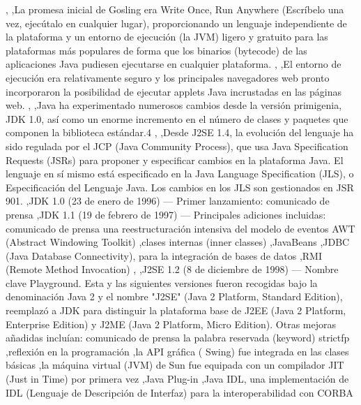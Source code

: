 \documentclass[11pt,a4paper]{$type}
\begin{document}
	\bigskip
							,
	\bigskip
							,La promesa inicial de Gosling era Write Once, Run Anywhere (Escríbelo una vez, ejecútalo en cualquier lugar), proporcionando un lenguaje independiente de la plataforma y un entorno de ejecución (la JVM) ligero y gratuito para las plataformas más populares de forma que los binarios (bytecode) de las aplicaciones Java pudiesen ejecutarse en cualquier plataforma.
	\bigskip
							,
	\bigskip
							,El entorno de ejecución era relativamente seguro y los principales navegadores web pronto incorporaron la posibilidad de ejecutar applets Java incrustadas en las páginas web.
	\bigskip
							,
	\bigskip
							,Java ha experimentado numerosos cambios desde la versión primigenia, JDK 1.0, así como un enorme incremento en el número de clases y paquetes que componen la biblioteca estándar.4
	\bigskip
							,
	\bigskip
							,Desde J2SE 1.4, la evolución del lenguaje ha sido regulada por el JCP (Java Community Process), que usa Java Specification Requests (JSRs) para proponer y especificar cambios en la plataforma Java. El lenguaje en sí mismo está especificado en la Java Language Specification (JLS), o Especificación del Lenguaje Java. Los cambios en los JLS son gestionados en JSR 901.
	\bigskip
							,JDK 1.0 (23 de enero de 1996) — Primer lanzamiento: comunicado de prensa
	\bigskip
							,JDK 1.1 (19 de febrero de 1997) — Principales adiciones incluidas: comunicado de prensa una reestructuración intensiva del modelo de eventos AWT (Abstract Windowing Toolkit)
	\bigskip
							,clases internas (inner classes)
	\bigskip
							,JavaBeans
	\bigskip
							,JDBC (Java Database Connectivity), para la integración de bases de datos
	\bigskip
							,RMI (Remote Method Invocation)
	\bigskip
							,
	\bigskip
							,J2SE 1.2 (8 de diciembre de 1998) — Nombre clave Playground. Esta y las siguientes versiones fueron recogidas bajo la denominación Java 2 y el nombre "J2SE" (Java 2 Platform, Standard Edition), reemplazó a JDK para distinguir la plataforma base de J2EE (Java 2 Platform, Enterprise Edition) y J2ME (Java 2 Platform, Micro Edition). Otras mejoras añadidas incluían: comunicado de prensa la palabra reservada (keyword) strictfp
	\bigskip
							,reflexión en la programación
	\bigskip
							,la API gráfica ( Swing) fue integrada en las clases básicas
	\bigskip
							,la máquina virtual (JVM) de Sun fue equipada con un compilador JIT (Just in Time) por primera vez
	\bigskip
							,Java Plug-in
	\bigskip
							,Java IDL, una implementación de IDL (Lenguaje de Descripción de Interfaz) para la interoperabilidad con CORBA
	\bigskip
\end{document}

